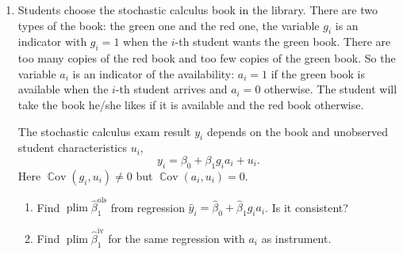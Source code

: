 \documentclass[12pt]{article}
\DeclareMathOperator{\Cov}{\mathbb{C}ov}
\DeclareMathOperator{\plim}{plim}
\newcommand{\hb}{\hat\beta}
\begin{document}
\begin{enumerate}
    \item Students choose the stochastic calculus book in the library. 
    There are two types of the book: the green one and the red one, 
    the variable $g_i$ is an indicator with $g_i = 1$ when the $i$-th student wants the green book. 
    There are too many copies of the red book and too few copies of the green book. 
    So the variable $a_i$ is an indicator of the availability: $a_i = 1$ if the green book 
    is available when the $i$-th student arrives and $a_i = 0$ otherwise.
    The student will take the book he/she likes if it is available and the red book otherwise. 

    The stochastic calculus exam result $y_i$ depends on the book and unobserved student characteristics $u_i$,
    \[
    y_i = \beta_0 + \beta_1 g_i a_i + u_i.
    \]
    Here $\Cov(g_i, u_i) \neq 0$ but $\Cov(a_i, u_i) = 0$.

    \begin{enumerate}
        \item Find $\plim \hb_1^{\text{ols}}$ from regression $\hat y_i = \hb_0 + \hb_1 g_i a_i$. 
        Is it consistent?
        \item Find $\plim \hb_1^{\text{iv}}$ for the same regression with $a_i$ as instrument. 
    \end{enumerate}


\end{enumerate}
\end{document}
